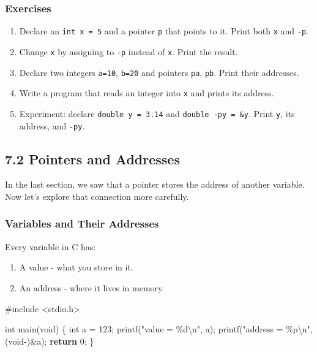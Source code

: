 \documentclass[
  letterpaper,
  DIV=11,
  numbers=noendperiod]{scrreprt}
\newenvironment{Shaded}{\begin{snugshade}}{\end{snugshade}}
\newcommand{\ControlFlowTok}[1]{\textcolor[rgb]{0.00,0.23,0.31}{\textbf{#1}}}
\newcommand{\DataTypeTok}[1]{\textcolor[rgb]{0.68,0.00,0.00}{#1}}
\newcommand{\DecValTok}[1]{\textcolor[rgb]{0.68,0.00,0.00}{#1}}
\newcommand{\ImportTok}[1]{\textcolor[rgb]{0.00,0.46,0.62}{#1}}
\newcommand{\NormalTok}[1]{\textcolor[rgb]{0.00,0.23,0.31}{#1}}
\newcommand{\OperatorTok}[1]{\textcolor[rgb]{0.37,0.37,0.37}{#1}}
\newcommand{\PreprocessorTok}[1]{\textcolor[rgb]{0.68,0.00,0.00}{#1}}
\newcommand{\SpecialCharTok}[1]{\textcolor[rgb]{0.37,0.37,0.37}{#1}}
\newcommand{\StringTok}[1]{\textcolor[rgb]{0.13,0.47,0.30}{#1}}
\providecommand{\tightlist}{%
  \setlength{\itemsep}{0pt}\setlength{\parskip}{0pt}}
\begin{document}
\subsubsection{Exercises}\label{exercises-30}

\begin{enumerate}
\def\labelenumi{\arabic{enumi}.}
\tightlist
\item
  Declare an \texttt{int\ x\ =\ 5} and a pointer \texttt{p} that points
  to it. Print both \texttt{x} and \texttt{-p}.
\item
  Change \texttt{x} by assigning to \texttt{-p} instead of \texttt{x}.
  Print the result.
\item
  Declare two integers \texttt{a=10}, \texttt{b=20} and pointers
  \texttt{pa}, \texttt{pb}. Print their addresses.
\item
  Write a program that reads an integer into \texttt{x} and prints its
  address.
\item
  Experiment: declare \texttt{double\ y\ =\ 3.14} and
  \texttt{double\ -py\ =\ \&y}. Print \texttt{y}, its address, and
  \texttt{-py}.
\end{enumerate}

\subsection{7.2 Pointers and Addresses}\label{pointers-and-addresses}

In the last section, we saw that a pointer stores the address of another
variable. Now let's explore that connection more carefully.

\subsubsection{Variables and Their
Addresses}\label{variables-and-their-addresses}

Every variable in C has:

\begin{enumerate}
\def\labelenumi{\arabic{enumi}.}
\tightlist
\item
  A value - what you store in it.
\item
  An address - where it lives in memory.
\end{enumerate}

\begin{Shaded}
\begin{Highlighting}[]
\PreprocessorTok{\#include }\ImportTok{\textless{}stdio.h\textgreater{}}

\DataTypeTok{int}\NormalTok{ main}\OperatorTok{(}\DataTypeTok{void}\OperatorTok{)} \OperatorTok{\{}
    \DataTypeTok{int}\NormalTok{ a }\OperatorTok{=} \DecValTok{123}\OperatorTok{;}
\NormalTok{    printf}\OperatorTok{(}\StringTok{"value = }\SpecialCharTok{\%d\textbackslash{}n}\StringTok{"}\OperatorTok{,}\NormalTok{ a}\OperatorTok{);}
\NormalTok{    printf}\OperatorTok{(}\StringTok{"address = }\SpecialCharTok{\%p\textbackslash{}n}\StringTok{"}\OperatorTok{,} \OperatorTok{(}\DataTypeTok{void}\OperatorTok{{-})\&}\NormalTok{a}\OperatorTok{);}
    \ControlFlowTok{return} \DecValTok{0}\OperatorTok{;}
\OperatorTok{\}}
\end{Highlighting}
\end{Shaded}
\end{document}
